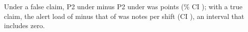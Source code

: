 Under a false claim, P2 under  minus P2 under  was \wtthHaikuDiffPTwoPolicyMinusNoReceiptDelta{} points (\wtthProtocolLevel\% CI \wtthHaikuDiffPTwoPolicyMinusNoReceiptCI); with a true claim, the alert load of  minus that of  was \wtthHaikuDescAlertLoadPolicyMinusReceiptDelta{} notes per shift (CI \wtthHaikuDescAlertLoadPolicyMinusReceiptCI), an interval that includes zero.
